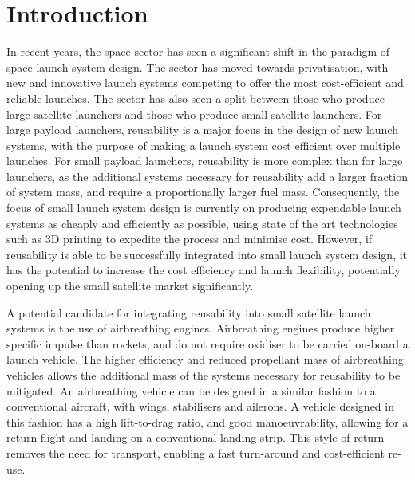 
\cleardoublepage
\chapter{Introduction}


  
  	
  	
  	
  	In recent years, the space sector has seen a significant shift in the paradigm of space launch system design. 
  	The sector has moved towards privatisation, with new and innovative launch systems competing to offer the most cost-efficient and reliable launches. 
  	The sector has also seen a split between those who produce large satellite launchers and those who produce small satellite launchers.
  	For large payload launchers, reusability is a major focus in the design of new launch systems, with the purpose of making a launch system cost efficient over multiple launches\cite{Faa2018}. 
  	For small payload launchers, reusability is more complex than for large launchers, as the additional systems necessary for reusability add a larger fraction of system mass, and require a proportionally larger fuel mass. 
  	Consequently, the focus of small launch system design is currently on producing expendable launch systems as cheaply and efficiently as possible, using state of the art technologies such as 3D printing to expedite the process and minimise cost\cite{Niederstrasser2015}.
  	However, if reusability is able to be successfully integrated into small launch system design, it has the potential to increase the cost efficiency and launch flexibility, potentially opening up the small satellite market significantly. 
  	
  	
  	
  	A potential candidate for integrating reusability into small satellite launch systems is the use of airbreathing engines\cite{Smart2009a,Ketsdever2010}.
Airbreathing engines produce higher specific impulse than rockets, and do not require oxidiser to be carried on-board a launch vehicle\cite{Smart2010}.  	 
  	The higher efficiency and reduced propellant mass of airbreathing vehicles allows the additional mass of the systems necessary for reusability to be mitigated\cite{Curran2003}. An airbreathing vehicle can be designed in a similar fashion to a conventional aircraft, with wings, stabilisers and ailerons\cite{Shaughnessy1990,Preller2017b}. A vehicle designed in this fashion has a high lift-to-drag ratio, and good manoeuvrability, allowing for a return flight and landing on a conventional landing strip\cite{Preller2017b}. This style of return removes the need for transport, enabling a fast turn-around and cost-efficient re-use. 
  	
